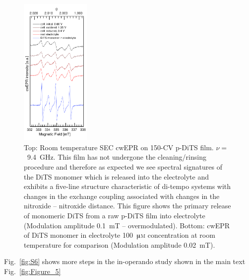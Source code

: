 \begin{figure}[h!]
\centering
\includegraphics[width=0.3\textwidth]{./operando_epr/figures/Figure_S5}
\caption{Top: Room temperature SEC cwEPR on 150-CV p-DiTS film. $\nu=$~9.4~GHz. This film has not undergone the cleaning/rinsing procedure and therefore as expected we see spectral signatures of the DiTS monomer which is released into the electrolyte and exhibits a five-line structure characteristic of di-tempo systems with changes in the exchange coupling associated with changes in the nitroxide -- nitroxide distance. This figure shows the primary release of monomeric DiTS from a raw p-DiTS film into electrolyte (Modulation amplitude 0.1~mT -- overmodulated). Bottom: cwEPR of DiTS monomer in electrolyte 100~$\muup$\textsc{m} concentration at room temperature for comparison (Modulation amplitude 0.02~mT).}
\label{fig:S5}
\end{figure}


Fig.~\ref{fig:S6} shows more steps in the in-operando study shown in the main text Fig.~\ref{fig:Figure_5}


